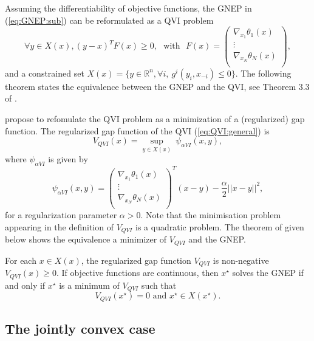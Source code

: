 \documentclass[11pt, a4paper]{article}
\newcommand{\txtm}[1]{\textrm{~~#1~~}}
\newcommand{\R}{\ensuremath{\mathbb{R}}}
\begin{document}
Assuming the differentiability of objective functions, the GNEP in  (\ref{eq:GNEP:sub}) can be reformulated as a QVI problem  
\begin{equation}
\forall y \in X(x), (y-x)^T F(x) \geq 0,
\txtm{with}
F(x) = 
\left( 
\begin{matrix}
\nabla_{x_1} \theta_1(x) \\
\vdots \\
\nabla_{x_N} \theta_N(x) \\
\end{matrix}
\right),
\label{eq:QVI:general}
\end{equation}
and a constrained set $X(x) = \{y \in \R^n, \forall i,~ g^i(y_i, x_{-i}) \leq 0 \}$.
The following theorem states the equivalence between the GNEP and the QVI, see Theorem 3.3 of \cite{facchkanz09b}. 

\cite{fukubo10} propose to refomulate the QVI problem as a minimization of a (regularized) gap function. 
The regularized gap function of the QVI (\ref{eq:QVI:general}) is
$$
V_{QVI}(x) = \underset{y\in X(x)}{\sup}~\psi_{\alpha VI}(x, y),
$$
where $\psi_{\alpha VI}$ is given by
\begin{equation}
\psi_{\alpha VI}(x, y) = \left( 
\begin{matrix}
\nabla_{x_1} \theta_1(x) \\
\vdots \\
\nabla_{x_N} \theta_N(x) \\
\end{matrix}
\right)^T (x-y) - \frac{\alpha}{2} ||x-y||^2,
\label{eq:psiVI}
\end{equation}
for a regularization parameter $\alpha>0$. 
Note that the minimisation problem appearing in the definition of $V_{QVI}$ is a quadratic problem. 
The  theorem of \cite{fukubo10} given below shows the equivalence a minimizer of $V_{QVI}$ and the GNEP.

For each $x\in X(x)$, the regularized gap function $V_{QVI}$ is non-negative $V_{QVI}(x) \geq 0$.
If objective functions are continuous, then $x^\star$ solves the GNEP if and only if $x^\star$ is a minimum of $V_{QVI}$ such that
\begin{equation}
V_{QVI}(x^\star)=0
\text{ and }
x^\star \in X(x^\star).
\label{eq:gapVI:general}
\end{equation}



\subsection{The jointly convex case}
\end{document}
